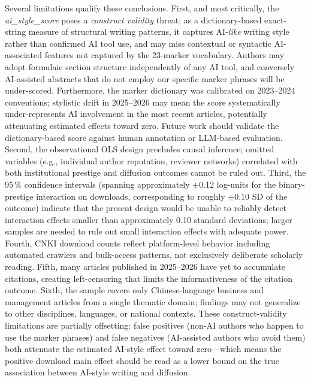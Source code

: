 \documentclass[12pt,a4paper]{article}
\begin{document}
Several limitations qualify these conclusions.
First, and most critically, the \textit{ai\_style\_score} poses a
\textit{construct validity} threat: as a dictionary-based exact-string
measure of structural writing patterns, it captures AI-\textit{like}
writing style rather than confirmed AI tool use, and may miss
contextual or syntactic AI-associated features not captured by the
23-marker vocabulary.
Authors may adopt formulaic section structure independently of any AI
tool, and conversely AI-assisted abstracts that do not employ
our specific marker phrases will be under-scored.
Furthermore, the marker dictionary was calibrated on 2023--2024
conventions; stylistic drift in 2025--2026 may mean the score
systematically under-represents AI involvement in the most recent
articles, potentially attenuating estimated effects toward zero.
Future work should validate the dictionary-based score against
human annotation or LLM-based evaluation.
Second, the observational OLS design precludes causal inference;
omitted variables (e.g., individual author reputation, reviewer networks)
correlated with both institutional prestige and diffusion outcomes
cannot be ruled out.
Third, the 95\,\% confidence intervals (spanning approximately
$\pm$0.12 log-units for the binary-prestige interaction on downloads,
corresponding to roughly $\pm$0.10 SD of the outcome)
indicate that the present design would be unable to reliably detect
interaction effects smaller than approximately 0.10 standard deviations;
larger samples are needed to rule out small interaction effects with
adequate power.
Fourth, CNKI download counts reflect platform-level behavior including
automated crawlers and bulk-access patterns, not exclusively deliberate
scholarly reading.
Fifth, many articles published in 2025--2026 have yet to accumulate
citations, creating left-censoring that limits the informativeness of
the citation outcome.
Sixth, the sample covers only Chinese-language business and management
articles from a single thematic domain; findings may not generalize
to other disciplines, languages, or national contexts.
These construct-validity limitations are partially offsetting: false
positives (non-AI authors who happen to use the marker phrases) and
false negatives (AI-assisted authors who avoid them) both attenuate
the estimated AI-style effect toward zero---which means the positive
download main effect should be read as a lower bound on the true
association between AI-style writing and diffusion.

\end{document}
